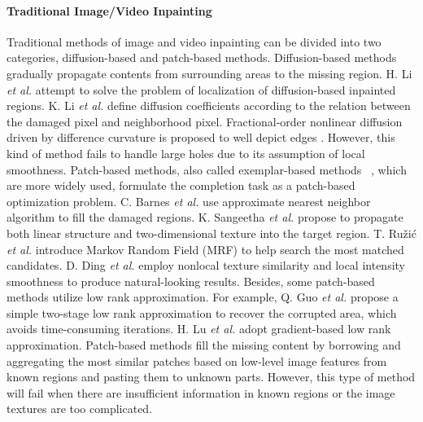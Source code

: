 \paragraph{Traditional Image/Video Inpainting}
Traditional methods of image and video inpainting can be divided into two categories, diffusion-based and patch-based methods. 
Diffusion-based methods \cite{bertalmio2000image,ballester2001filling} gradually propagate contents from surrounding areas to the missing region. 
H. Li \emph{et al.} \cite{li2017localization} attempt to solve the problem of localization of diffusion-based inpainted regions.
K. Li \emph{et al.}\cite{li2016image} define diffusion coefficients according to the relation between the damaged pixel and neighborhood pixel.
Fractional-order nonlinear diffusion driven by difference curvature is proposed to well depict edges \cite{sridevi2019image}. 
However, this kind of method fails to handle large holes due to its assumption of local smoothness. 
%
Patch-based methods, also called exemplar-based methods ~\cite{bertalmio2003simultaneous,efros2001image}, which are more widely used, formulate the completion task as a patch-based optimization problem. 
C. Barnes \emph{et al.} \cite{barnes2009patchmatch} use approximate nearest neighbor algorithm to fill the damaged regions.
K. Sangeetha \emph{et al.} \cite{sangeetha2011combined} propose to propagate both linear structure and two-dimensional texture into the target region.
T. Ru{\v{z}}i{\'c} \emph{et al.} \cite{ruvzic2014context} introduce Markov Random Field (MRF) to help search the most matched candidates.
D. Ding \emph{et al.} \cite{ding_19nonlocal} employ nonlocal texture similarity and local intensity smoothness to produce natural-looking results.
Besides, some patch-based methods utilize low rank approximation. For example, Q. Guo \emph{et al.} \cite{pb_lowrank2018} propose a simple two-stage low rank approximation to recover the corrupted area, which avoids time-consuming iterations.
H. Lu \emph{et al.} \cite{lu2018gradient} adopt gradient-based low rank approximation.
Patch-based methods fill the missing content by borrowing and aggregating the most similar patches based on low-level image features from known regions and pasting them to unknown parts. However, this type of method will fail when there are insufficient information in known regions or the image textures are too complicated.  
%

